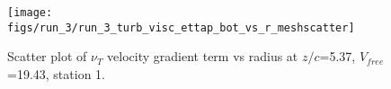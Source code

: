 \begin{figure}[H]
\centering
\texttt{[image: figs/run\_3/run\_3\_turb\_visc\_ettap\_bot\_vs\_r\_meshscatter]}
\caption{Scatter plot of $\nu_T$ velocity gradient term vs radius at $z/c$=5.37, $V_{free}$=19.43, station 1.}
\label{fig:run_3_turb_visc_ettap_bot_vs_r_meshscatter}
\end{figure}


